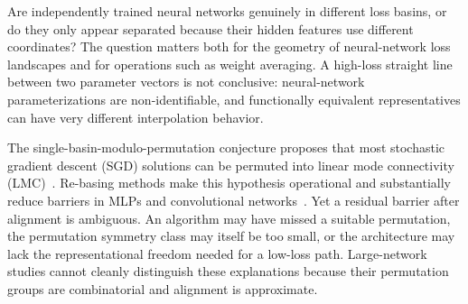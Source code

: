 \documentclass[twoside]{article}
\begin{document}
Are independently trained neural networks genuinely in different loss basins, or
do they only appear separated because their hidden features use different
coordinates?  The question matters both for the geometry of neural-network
loss landscapes and for operations such as weight averaging.  A high-loss
straight line between two parameter vectors is not conclusive: neural-network
parameterizations are non-identifiable, and functionally equivalent
representatives can have very different interpolation behavior.

The single-basin-modulo-permutation conjecture proposes that most stochastic
gradient descent (SGD) solutions can be permuted into linear mode connectivity
(LMC)~\citep{entezari2021role}.  Re-basing methods make this hypothesis
operational and substantially reduce barriers in MLPs and convolutional
networks~\citep{ainsworth2023git,guerrero2023rebasin}.  Yet a residual barrier
after alignment is ambiguous.  An algorithm may have missed a suitable
permutation, the permutation symmetry class may itself be too small, or the
architecture may lack the representational freedom needed for a low-loss path.
Large-network studies cannot cleanly distinguish these explanations because
their permutation groups are combinatorial and alignment is approximate.
\end{document}
